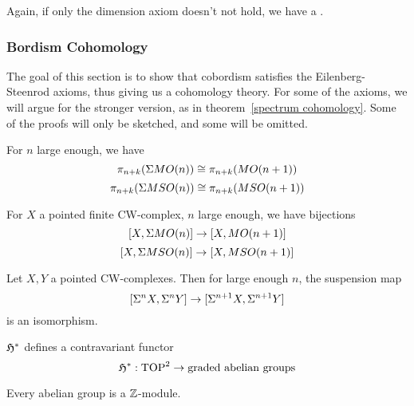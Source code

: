 \documentclass[a4paper,11pt]{article}
\begin{document}
Again, if only the dimension axiom doesn't not hold, we have a .

\subsubsection{Bordism Cohomology}\label{cohomology}\label{Kap Bordism Cohomology}
The goal of this section is to show that cobordism satisfies the Eilenberg-Steenrod axioms, thus giving us a cohomology theory. For some of the axioms, we will argue for the stronger version, as in theorem\ \ref{spectrum cohomology}. Some of the proofs will only be sketched, and some will be omitted.

\begin{theorem}
    For \(n\) large enough, we have
    \[\pi_{n+k}(\Sigma MO(n))\cong\pi_{n+k}(MO(n+1))\]
    \[\pi_{n+k}(\Sigma MSO(n))\cong\pi_{n+k}(MSO(n+1))\]
\end{theorem}

\begin{corollary}
    For \(X\) a pointed finite CW-complex, \(n\) large enough, we have bijections
    \[[X,\Sigma MO(n)]\to[X,MO(n+1)]\]
    \[[X,\Sigma MSO(n)]\to[X,MSO(n+1)]\]
\end{corollary}

\begin{theorem}\label{freudenthal}
    Let \(X,Y\) a pointed CW-complexes. Then for large enough \(n\), the suspension map
    \[[\Sigma^n X,\Sigma^n Y]\to[\Sigma^{n+1} X,\Sigma^{n+1}Y]\]
    is an isomorphism.
\end{theorem}

\begin{lemma}[Functoriality]\label{cofunctoriality}
    \(\mathfrak{H}^\ast\) defines a contravariant functor
    \[\mathfrak{H}^\ast:\mathrm{TOP}^2\to \text{graded abelian groups}\]
\end{lemma}

\begin{remark}
    Every abelian group is a \(\mathbb{Z}\)-module.
\end{remark}
\end{document}
